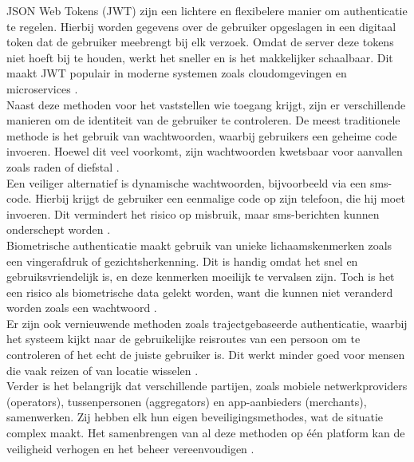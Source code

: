 JSON Web Tokens (JWT) zijn een lichtere en flexibelere manier om authenticatie te regelen. Hierbij worden gegevens over de gebruiker opgeslagen in een digitaal token dat de gebruiker meebrengt bij elk verzoek. Omdat de server deze tokens niet hoeft bij te houden, werkt het sneller en is het makkelijker schaalbaar. Dit maakt JWT populair in moderne systemen zoals cloudomgevingen en microservices \autocite{Gao2023}.\\

Naast deze methoden voor het vaststellen wie toegang krijgt, zijn er verschillende manieren om de identiteit van de gebruiker te controleren. De meest traditionele methode is het gebruik van wachtwoorden, waarbij gebruikers een geheime code invoeren. Hoewel dit veel voorkomt, zijn wachtwoorden kwetsbaar voor aanvallen zoals raden of diefstal \autocite{Zukarnain2022}.\\

Een veiliger alternatief is dynamische wachtwoorden, bijvoorbeeld via een sms-code. Hierbij krijgt de gebruiker een eenmalige code op zijn telefoon, die hij moet invoeren. Dit vermindert het risico op misbruik, maar sms-berichten kunnen onderschept worden \autocite{Zukarnain2022}.\\

Biometrische authenticatie maakt gebruik van unieke lichaamskenmerken zoals een vingerafdruk of gezichtsherkenning. Dit is handig omdat het snel en gebruiksvriendelijk is, en deze kenmerken moeilijk te vervalsen zijn. Toch is het een risico als biometrische data gelekt worden, want die kunnen niet veranderd worden zoals een wachtwoord \autocite{Zukarnain2022}.\\

Er zijn ook vernieuwende methoden zoals trajectgebaseerde authenticatie, waarbij het systeem kijkt naar de gebruikelijke reisroutes van een persoon om te controleren of het echt de juiste gebruiker is. Dit werkt minder goed voor mensen die vaak reizen of van locatie wisselen \autocite{Zukarnain2022}.\\

Verder is het belangrijk dat verschillende partijen, zoals mobiele netwerkproviders (operators), tussenpersonen (aggregators) en app-aanbieders (merchants), samenwerken. Zij hebben elk hun eigen beveiligingsmethodes, wat de situatie complex maakt. Het samenbrengen van al deze methoden op één platform kan de veiligheid verhogen en het beheer vereenvoudigen \textcite{Zukarnain2022}.\\

